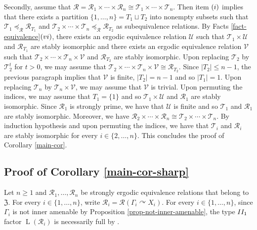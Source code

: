 \documentclass[11pt]{amsart}
\numberwithin{equation}{section}
\theoremstyle{plain}
\theoremstyle{definition}
\newcommand{\rL}{\operatorname{L}}
\begin{document}
Secondly, assume that $\mathscr R = \mathscr R_1 \times \cdots \times \mathscr R_{n} \cong \mathscr T_1 \times \cdots \times \mathscr T_{n}$. Then item $(\rm i)$ implies that there exists a partition $\{1, \dots, n\} = T_1 \sqcup T_2$ into nonempty subsets such that $\mathscr T_1 \preceq_{\mathscr R} \mathscr R_{T_1}$ and $\mathscr T_2 \times \cdots \times \mathscr T_n \preceq_{\mathscr R} \mathscr R_{T_2}$ as subequivalence relations. By Facts \ref{fact-equivalence}$(\rm vi)$, there exists an ergodic equivalence relation $\mathscr U$ such that $\mathscr T_1 \times \mathscr U$ and $\mathscr R_{T_1}$ are stably isomorphic and there exists an ergodic equivalence relation $\mathscr V$ such that $\mathscr T_2 \times \cdots \times \mathscr T_n \times \mathscr V$ and $\mathscr R_{T_2}$ are stably isomorphic. Upon replacing $\mathscr T_2$ by $\mathscr T_2^t$ for $t > 0$, we may assume that $\mathscr T_2 \times \cdots \times \mathscr T_{n} \times \mathscr V \cong \mathscr R_{T_2}$. Since $|T_2| \leq n - 1$, the previous paragraph implies that $\mathscr V$ is finite, $|T_2| = n - 1$ and so $|T_1| = 1$. Upon replacing $\mathscr T_n$ by $\mathscr T_n \times \mathscr V$, we may assume that $\mathscr V$ is trivial. Upon permuting the indices, we may assume that $T_1 = \{1\}$ and so $\mathscr T_1 \times \mathscr U$ and $\mathscr R_1$ are stably isomorphic. Since $\mathscr R_1$ is strongly prime, we have that $\mathscr U$ is finite and so $\mathscr T_1$ and $\mathscr R_1$ are stably isomorphic. Moreover, we have $\mathscr R_2 \times \cdots \times \mathscr R_{n} \cong \mathscr T_2 \times \cdots \times \mathscr T_{n}$. By induction hypothesis and upon permuting the indices, we have that $\mathscr T_i$ and $\mathscr R_i$ are stably isomorphic for every $i \in \{2, \dots, n\}$. This concludes the proof of Corollary \ref{main-cor}.



\subsection{Proof of Corollary \ref{main-cor-sharp}}

Let $n \geq 1$ and $\mathscr R_1, \dots, \mathscr R_n$ be strongly ergodic equivalence relations that belong to $\mathfrak Z$. For every $i \in \{1, \dots, n\}$, write $\mathscr R_i = \mathscr R(\Gamma_i \curvearrowright X_i)$. For every $i \in \{1, \dots, n\}$, since $\Gamma_i$ is not inner amenable by Proposition \ref{prop-not-inner-amenable}, the type ${\rm II_1}$ factor $\rL(\mathscr R_i)$ is necessarily full by \cite{Ch81}.
\end{document}
